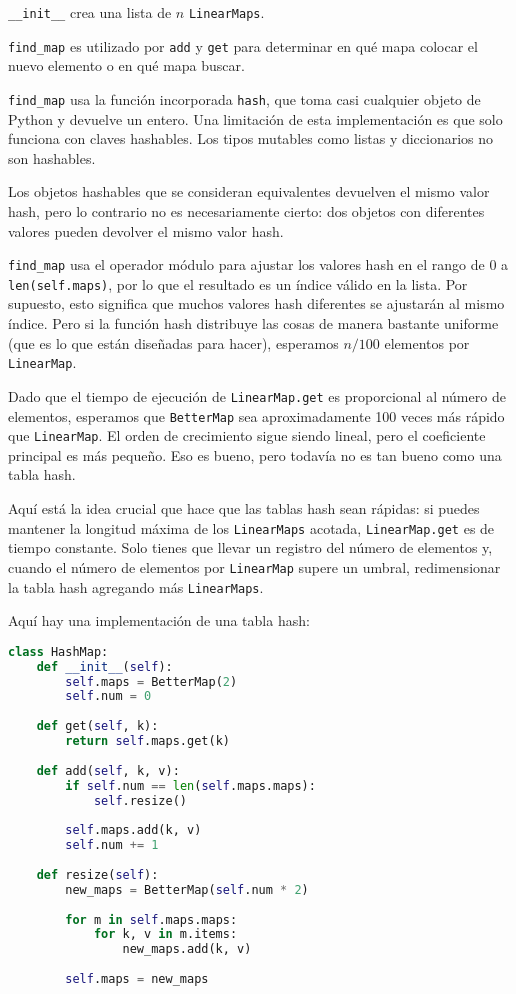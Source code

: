 \texttt{\_\_init\_\_} crea una lista de \( n \) \texttt{LinearMaps}.

\texttt{find\_map} es utilizado por \texttt{add} y \texttt{get} para determinar en qué mapa colocar el nuevo elemento o en qué mapa buscar.

\texttt{find\_map} usa la función incorporada \texttt{hash}, que toma casi cualquier objeto de Python y devuelve un entero. Una limitación de esta implementación es que solo funciona con claves hashables. Los tipos mutables como listas y diccionarios no son hashables.

Los objetos hashables que se consideran equivalentes devuelven el mismo valor hash, pero lo contrario no es necesariamente cierto: dos objetos con diferentes valores pueden devolver el mismo valor hash.

\texttt{find\_map} usa el operador módulo para ajustar los valores hash en el rango de 0 a \texttt{len(self.maps)}, por lo que el resultado es un índice válido en la lista. Por supuesto, esto significa que muchos valores hash diferentes se ajustarán al mismo índice. Pero si la función hash distribuye las cosas de manera bastante uniforme (que es lo que están diseñadas para hacer), esperamos \( n/100 \) elementos por \texttt{LinearMap}.

Dado que el tiempo de ejecución de \texttt{LinearMap.get} es proporcional al número de elementos, esperamos que \texttt{BetterMap} sea aproximadamente 100 veces más rápido que \texttt{LinearMap}. El orden de crecimiento sigue siendo lineal, pero el coeficiente principal es más pequeño. Eso es bueno, pero todavía no es tan bueno como una tabla hash.

Aquí está la idea crucial que hace que las tablas hash sean rápidas: si puedes mantener la longitud máxima de los \texttt{LinearMaps} acotada, \texttt{LinearMap.get} es de tiempo constante. Solo tienes que llevar un registro del número de elementos y, cuando el número de elementos por \texttt{LinearMap} supere un umbral, redimensionar la tabla hash agregando más \texttt{LinearMaps}.

Aquí hay una implementación de una tabla hash:

\begin{lstlisting}[language=Python]
class HashMap:
    def __init__(self):
        self.maps = BetterMap(2)
        self.num = 0
    
    def get(self, k):
        return self.maps.get(k)
    
    def add(self, k, v):
        if self.num == len(self.maps.maps):
            self.resize()
        
        self.maps.add(k, v)
        self.num += 1
    
    def resize(self):
        new_maps = BetterMap(self.num * 2)
        
        for m in self.maps.maps:
            for k, v in m.items:
                new_maps.add(k, v)
        
        self.maps = new_maps
\end{lstlisting}

